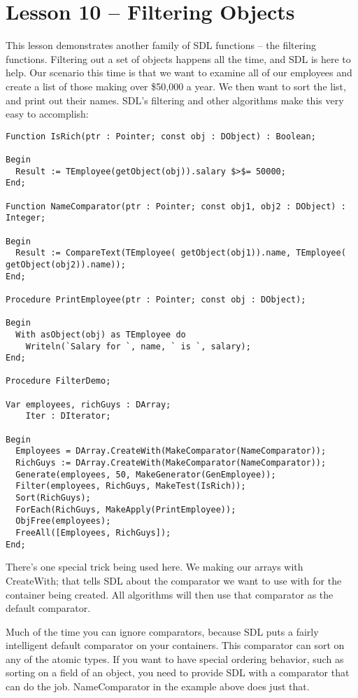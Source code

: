 \documentclass{report}
\begin{document}
\section{Lesson 10 -- Filtering Objects}

This lesson demonstrates another family of SDL functions -- the filtering
functions. Filtering out a set of objects happens all the time, and SDL is
here to help. Our scenario this time is that we want to examine all of our
employees and create a list of those making over \$50,000 a year. We then
want to sort the list, and print out their names. SDL's filtering and
other algorithms make this very easy to accomplish:

\begin{lstlisting}
Function IsRich(ptr : Pointer; const obj : DObject) : Boolean;

Begin
  Result := TEmployee(getObject(obj)).salary $>$= 50000;
End;

Function NameComparator(ptr : Pointer; const obj1, obj2 : DObject) : Integer;

Begin
  Result := CompareText(TEmployee( getObject(obj1)).name, TEmployee( getObject(obj2)).name));
End;

Procedure PrintEmployee(ptr : Pointer; const obj : DObject);

Begin
  With asObject(obj) as TEmployee do
    Writeln(`Salary for `, name, ` is `, salary);
End;

Procedure FilterDemo;

Var employees, richGuys : DArray;
    Iter : DIterator;

Begin
  Employees = DArray.CreateWith(MakeComparator(NameComparator));
  RichGuys := DArray.CreateWith(MakeComparator(NameComparator));
  Generate(employees, 50, MakeGenerator(GenEmployee));
  Filter(employees, RichGuys, MakeTest(IsRich));
  Sort(RichGuys);
  ForEach(RichGuys, MakeApply(PrintEmployee));
  ObjFree(employees);
  FreeAll([Employees, RichGuys]);
End;
\end{lstlisting}

There's one special trick being used here. We making our arrays with
CreateWith; that tells SDL about the comparator we want to use with for the
container being created. All algorithms will then use that comparator as the
default comparator.

Much of the time you can ignore comparators, because SDL puts a fairly
intelligent default comparator on your containers. This comparator can sort
on any of the atomic types. If you want to have special ordering behavior,
such as sorting on a field of an object, you need to provide SDL with a
comparator that can do the job. NameComparator in the example above does
just that.
\end{document}
